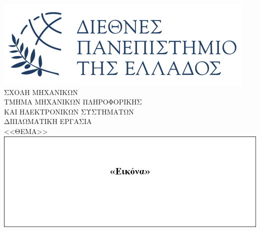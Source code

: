 \documentclass[twoside, a4paper, 11pt]{article}
\begin{document}

\begin{titlepage}

\newcommand{\HRule}{\rule{\linewidth}{0.6mm}}
\center
\includegraphics[scale=0.6]{Images/ihu-logo-gr.png}\\[1cm]

\textsc{\huge ΣΧΟΛΗ ΜΗΧΑΝΙΚΩΝ}\\

\textsc{\huge ΤΜΗΜΑ ΜΗΧΑΝΙΚΩΝ ΠΛΗΡΟΦΟΡΙΚΗΣ \\ ΚΑΙ ΗΛΕΚΤΡΟΝΙΚΩΝ ΣΥΣΤΗΜΑΤΩΝ}\\[1.5cm] %

\textsc{\huge ΔΙΠΛΩΜΑΤΙΚΗ ΕΡΓΑΣΙΑ}\\[0.2cm]
{\huge <<ΘΕΜΑ>>}\\[1cm]

\includegraphics[scale=0.8]{Images/Cover-Image-Placeholder.png}\\[1cm]


\end{titlepage}
\end{document}

